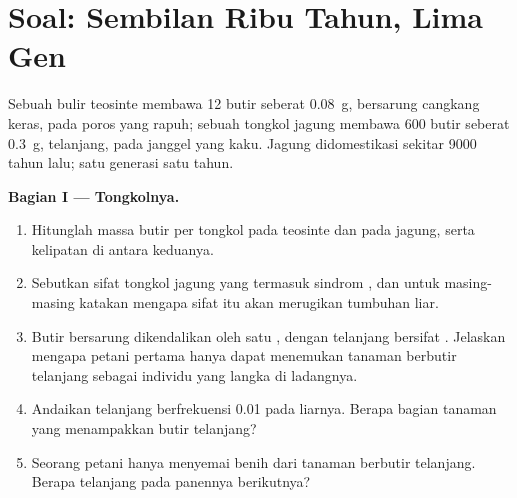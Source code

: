 \section{Soal: Sembilan Ribu Tahun, Lima Gen}

\begin{problem}
\label{pb:g12:domesticated-plants:1}
Sebuah bulir teosinte membawa 12 butir seberat \qty{0.08}{g},
bersarung cangkang keras, pada poros yang rapuh; sebuah tongkol jagung
membawa 600 butir seberat \qty{0.3}{g}, telanjang, pada janggel yang
kaku. Jagung didomestikasi sekitar 9000 tahun lalu; satu generasi satu
tahun.

\medskip
\noindent\textbf{Bagian I --- Tongkolnya.}
\begin{enumerate}
  \item Hitunglah massa butir per tongkol pada teosinte dan pada
        jagung, serta kelipatan di antara keduanya.
  \item Sebutkan sifat tongkol jagung yang termasuk sindrom
        , dan untuk masing-masing katakan mengapa sifat itu
        akan merugikan tumbuhan liar.
  \item Butir bersarung dikendalikan oleh satu , dengan 
        telanjang bersifat . Jelaskan mengapa petani pertama
        hanya dapat menemukan tanaman berbutir telanjang sebagai
        individu yang langka di ladangnya.
  \item Andaikan  telanjang berfrekuensi 0.01 pada 
        liarnya. Berapa bagian tanaman yang menampakkan butir
        telanjang?
  \item Seorang petani hanya menyemai benih dari tanaman berbutir
        telanjang. Berapa  telanjang pada panennya
        berikutnya?
\end{enumerate}


\end{problem}
